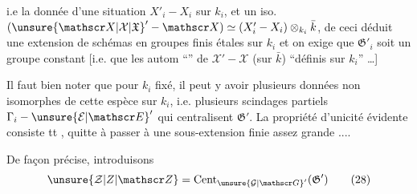 i.e la donnée d’une situation $X'_i\mathbin{-}X_i$ sur $k_i$,  et un iso. $(\unsure{\mathscr X|\mathcal X|\mathfrak X}'\mathbin{-}\mathscr X)\simeq(X'_i\mathbin{-}X_i)\otimes_{k_i}\bar k$, de ceci  déduit une extension de schémas en groupes finis étales sur $k_i$
et on exige que $\mathfrak G'_i$ soit un groupe constant [i.e. que les autom ``'' de $\mathscr X'\mathbin{-}\mathscr X$ (sur $\bar k$)  ``définis sur $k_i$'' \dots]

Il faut bien noter que pour $k_i$ fixé, il peut y avoir plusieurs données non isomorphes de cette espèce sur $k_i$, i.e. plusieurs scindages partiels $\Gamma_i\mathbin{-}\unsure{\mathcal E|\mathscr E}'$ qui centralisent $\mathfrak G'$.  La propriété d’unicité  évidente consiste  tt , quitte à passer à une sous-extension finie assez grande ....

De façon précise, introduisons
\[
\unsure{\mathcal Z|Z|\mathscr Z}=\mathrm{Cent}_{\unsure{\mathcal G|\mathscr G}'}(\mathfrak G')\tag*{(28)}
\]
